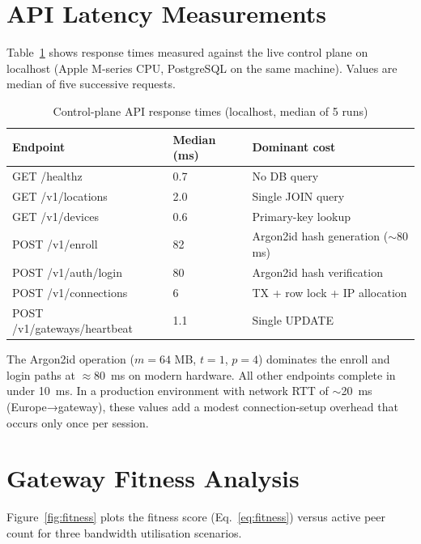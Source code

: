 \documentclass[12pt,a4paper]{report}
\begin{document}
\section{API Latency Measurements}

Table~\ref{tab:latency} shows response times measured against the live control plane on localhost (Apple M-series CPU, PostgreSQL on the same machine). Values are median of five successive requests.

\begin{table}[H]
\centering\small
\caption{Control-plane API response times (localhost, median of 5 runs)}
\label{tab:latency}
\begin{tabular}{lll}
\toprule
\textbf{Endpoint} & \textbf{Median (ms)} & \textbf{Dominant cost}\\
\midrule
GET /healthz                  & 0.7  & No DB query\\
GET /v1/locations             & 2.0  & Single JOIN query\\
GET /v1/devices               & 0.6  & Primary-key lookup\\
POST /v1/enroll               & 82   & Argon2id hash generation ($\sim$80 ms)\\
POST /v1/auth/login           & 80   & Argon2id hash verification\\
POST /v1/connections          & 6    & TX + row lock + IP allocation\\
POST /v1/gateways/heartbeat   & 1.1  & Single UPDATE\\
\bottomrule
\end{tabular}
\end{table}

The Argon2id operation ($m=64$ MB, $t=1$, $p=4$) dominates the enroll and login paths at $\approx$80~ms on modern hardware. All other endpoints complete in under 10~ms. In a production environment with network RTT of $\sim$20~ms (Europe→gateway), these values add a modest connection-setup overhead that occurs only once per session.

\section{Gateway Fitness Analysis}

Figure~\ref{fig:fitness} plots the fitness score (Eq.~\ref{eq:fitness}) versus active peer count for three bandwidth utilisation scenarios.
\end{document}

